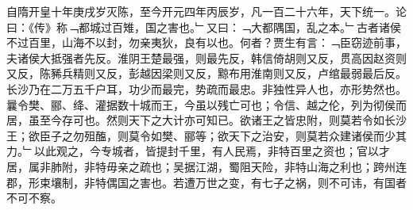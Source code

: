 {自隋开皇十年庚戌岁灭陈，至今开元四年丙辰岁，凡一百二十六年，天下统一。论曰：《传》称﹁都城过百雉，国之害也。﹂又曰：﹁大都隅国，乱之本。﹂古者诸侯不过百里，山海不以封，勿亲夷狄，良有以也。何者？贾生有言：﹁臣窃迹前事，夫诸侯大抵强者先反。淮阴王楚最强，则最先反，韩信倚胡则又反，贯高因赵资则又反，陈豨兵精则又反，彭越因梁则又反，黥布用淮南则又反，卢绾最弱最后反。长沙乃在二万五千户耳，功少而最完，势疏而最忠。非独性异人也，亦形势然也。曩令樊、郦、绛、灌据数十城而王，今虽以残亡可也；令信、越之伦，列为彻侯而居，虽至今存可也。然则天下之大计亦可知已。欲诸王之皆忠附，则莫若令如长沙王；欲臣子之勿殂醢，则莫令如樊、郦等；欲天下之治安，则莫若众建诸侯而少其力。﹂以此观之，今专城者，皆提封千里，有人民焉，非特百里之资也；官以才居，属非肺附，非特毋亲之疏也；吴据江湖，蜀阻天险，非特山海之利也；跨州连郡，形束壤制，非特偶国之害也。若遭万世之变，有七子之祸，则不可讳，有国者不可不察。\\%
%
}
